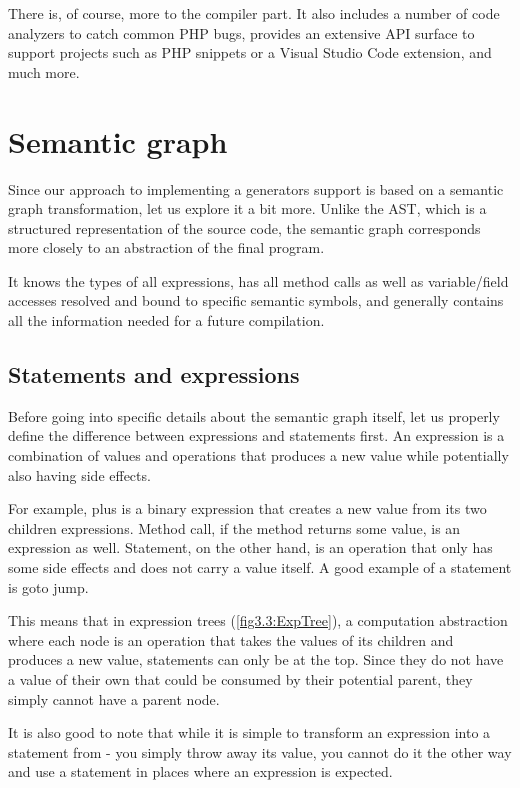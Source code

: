 There is, of course, more to the compiler part. It also includes a number of code analyzers to catch common PHP bugs, provides an extensive API surface to support projects such as PHP snippets or a Visual Studio Code extension, and much more.

\section{Semantic graph}

Since our approach to implementing a generators support is based on a semantic graph transformation, let us explore it a bit more. Unlike the AST, which is a structured representation of the source code, the semantic graph corresponds more closely to an abstraction of the final program.

It knows the types of all expressions, has all method calls as well as variable/field accesses resolved and bound to specific semantic symbols, and generally contains all the information needed for a future compilation.

\subsection{Statements and expressions}

Before going into specific details about the semantic graph itself, let us properly define the difference between expressions and statements first. An expression is a combination of values and operations that produces a new value while potentially also having side effects. 

For example, plus is a binary expression that creates a new value from its two children expressions. Method call, if the method returns some value, is an expression as well. Statement, on the other hand, is an operation that only has some side effects and does not carry a value itself. A good example of a statement is goto jump.

This means that in expression trees (\autoref{fig3.3:ExpTree}), a computation abstraction where each node is an operation that takes the values of its children and produces a new value, statements can only be at the top. Since they do not have a value of their own that could be consumed by their potential parent, they simply cannot have a parent node. 

It is also good to note that while it is simple to transform an expression into a statement from - you simply throw away its value, you cannot do it the other way and use a statement in places where an expression is expected. 

